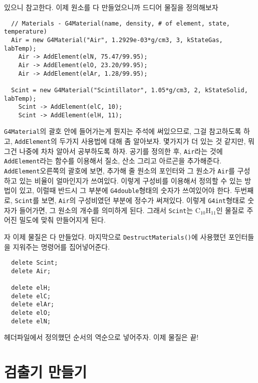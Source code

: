 있으니 참고한다. 이제 원소를 다 만들었으니까 드디어 물질을 정의해보자
\begin{pc}
\begin{lstlisting}
  // Materials - G4Material(name, density, # of element, state, temperature)
  Air = new G4Material("Air", 1.2929e-03*g/cm3, 3, kStateGas, labTemp);
    Air -> AddElement(elN, 75.47/99.95); 
    Air -> AddElement(elO, 23.20/99.95); 
    Air -> AddElement(elAr, 1.28/99.95); 

  Scint = new G4Material("Scintillator", 1.05*g/cm3, 2, kStateSolid, labTemp);
    Scint -> AddElement(elC, 10);
    Scint -> AddElement(elH, 11);
\end{lstlisting}
\end{pc}
\texttt{G4Material}의 괄호 안에 들어가는게 뭔지는 주석에 써있으므로, 그걸
참고하도록 하고, \texttt{AddElement}의 두가지 사용법에 대해 좀 알아보자.
몇가지가 더 있는 것 같지만, 뭐 그건 나중에 차차 알아서 공부하도록 하자. 공기를
정의한 후, \texttt{Air}라는 것에 \texttt{AddElement}라는 함수를 이용해서 질소,
산소 그리고 아르곤을 추가해준다. \texttt{AddElement}오른쪽의 괄호에 보면,
추가해 줄 원소의 포인터와 그 원소가 \texttt{Air}를 구성하고 있는 비율이 얼마인지가
쓰여있다. 이렇게 구성비를 이용해서 정의할 수 있는 방법이 있고, 이럴때 반드시 그
부분에 \texttt{G4double}형태의 숫자가 쓰여있어야 한다. 두번째로,
\texttt{Scint}를 보면, \texttt{Air}의 구성비였던 부분에 정수가 써져있다. 이렇게
\texttt{G4int}형태로 숫자가 들어가면, 그 원소의 개수를 의미하게 된다. 그래서
\texttt{Scint}는 C$_{10}$H$_{11}$인 물질로 주어진 밀도에 맞춰 만들어지게 된다.

자 이제 물질은 다 만들었다. 마지막으로 \texttt{DestructMaterials()}에 사용했던
포인터들을 지워주는 명령어를 집어넣어준다.
\begin{pc}
\begin{lstlisting}
  delete Scint;
  delete Air;

  delete elH;
  delete elC;
  delete elAr;
  delete elO;
  delete elN;
\end{lstlisting}
\end{pc}
헤더파일에서 정의했던 순서의 역순으로 넣어주자. 이제 물질은 끝!

\section{검출기 만들기}

